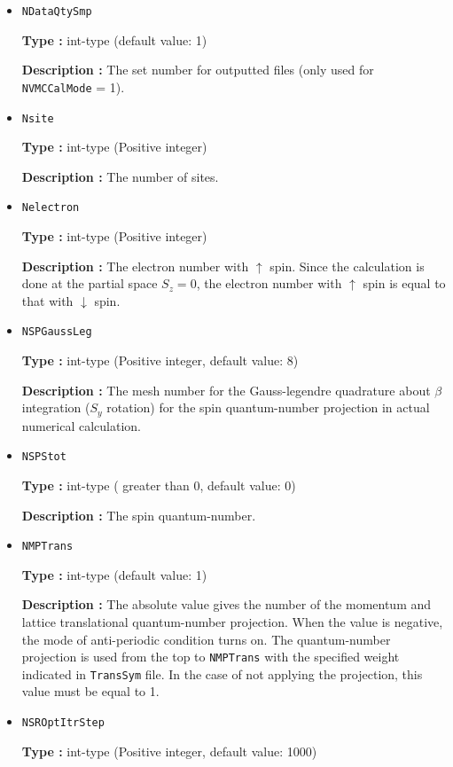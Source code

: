 \begin{itemize}
 \item  \verb|NDataQtySmp|

 {\bf Type :} int-type (default value: 1)

{\bf Description :} The set number for outputted files (only used for \verb|NVMCCalMode| = 1). 

 \item  \verb|Nsite|

{\bf Type :} int-type (Positive integer)

{\bf Description :} The number of sites.  

\item  \verb|Nelectron|

{\bf Type :} int-type (Positive integer)

{\bf Description :} The electron number with $\uparrow$ spin. Since the calculation is done at the partial space $S_z=0$,  the electron number with $\uparrow$ spin is equal to that with $\downarrow$ spin.

 \item  \verb|NSPGaussLeg|

{\bf Type :} {int-type (Positive integer, default value: 8)}

{\bf Description :} The mesh number for the Gauss-legendre quadrature about $\beta$ integration ($S_y$ rotation) for the spin quantum-number projection in actual numerical calculation.

 \item  \verb|NSPStot|

{\bf Type :} int-type ( greater than 0,  default value: 0)

{\bf Description :}   The spin quantum-number. 

 \item  \verb|NMPTrans|

{\bf Type :} int-type (default value: 1)

{\bf Description :} 
The absolute value gives the number of the momentum and lattice translational quantum-number projection. When the value is negative, the mode of anti-periodic condition turns on. The quantum-number projection is used from the top to \verb|NMPTrans| with the specified weight indicated in \verb|TransSym| file. In the case of not applying the projection, this value must be equal to 1.

 \item  \verb|NSROptItrStep|

{\bf Type :} int-type (Positive integer, default value: 1000)


\end{itemize}
